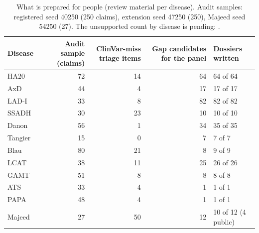 \documentclass{article} %
\begin{document}
\begin{table}[h]
\caption{What is prepared for people (review material per disease). Audit samples: registered seed 40250 (250 claims), extension seed 47250 (250), Majeed seed 54250 (27). The unsupported count by disease is pending: .}
\begin{center}
\scriptsize
\begin{tabular}{lrrrl}
\toprule
Disease & Audit sample (claims) & ClinVar-miss triage items & Gap candidates for the panel & Dossiers written \\
\midrule
HA20 & 72 & 14 & 64 & 64 of 64 \\
AxD & 44 & 4 & 17 & 17 of 17 \\
LAD-I & 33 & 8 & 82 & 82 of 82 \\
SSADH & 30 & 23 & 10 & 10 of 10 \\
Danon & 56 & 1 & 34 & 35 of 35 \\
Tangier & 15 & 0 & 7 & 7 of 7 \\
\midrule
Blau & 80 & 21 & 8 & 9 of 9 \\
LCAT & 38 & 11 & 25 & 26 of 26 \\
GAMT & 51 & 8 & 8 & 8 of 8 \\
ATS & 33 & 4 & 1 & 1 of 1 \\
PAPA & 48 & 4 & 1 & 1 of 1 \\
\midrule
Majeed & 27 & 50 & 12 & 10 of 12 (4 public) \\
\bottomrule
\end{tabular}
\end{center}
\end{table}
\end{document}
